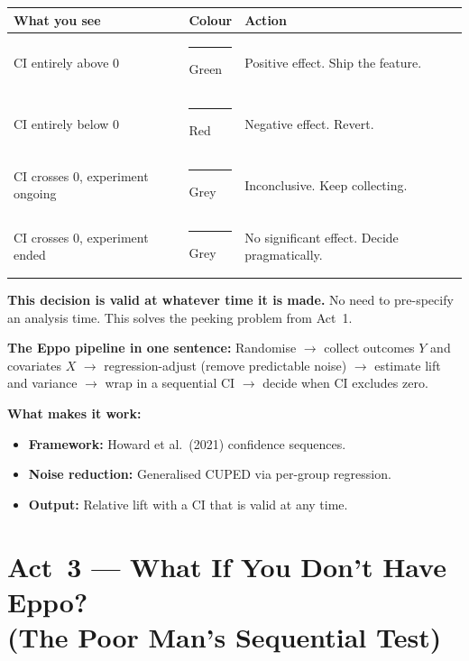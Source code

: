 \documentclass[12pt, a4paper]{article}
\begin{document}
\begin{center}
\renewcommand{\arraystretch}{1.3}
\begin{tabular}{@{} l l p{6.5cm} @{}}
\toprule
\textbf{What you see} & \textbf{Colour} & \textbf{Action} \\
\midrule
CI entirely above 0
  & \textcolor{green!60!black}{\rule{1em}{1em}} Green
  & Positive effect.  Ship the feature. \\
CI entirely below 0
  & \textcolor{red}{\rule{1em}{1em}} Red
  & Negative effect.  Revert. \\
CI crosses 0, experiment ongoing
  & \textcolor{gray}{\rule{1em}{1em}} Grey
  & Inconclusive.  Keep collecting. \\
CI crosses 0, experiment ended
  & \textcolor{gray}{\rule{1em}{1em}} Grey
  & No significant effect.  Decide pragmatically. \\
\bottomrule
\end{tabular}
\end{center}

\textbf{This decision is valid at whatever time it is made.}  No need to
pre-specify an analysis time.  This solves the peeking problem from Act~1.

\begin{keytakeaway}
\textbf{The Eppo pipeline in one sentence:}
Randomise $\to$ collect outcomes $Y$ and covariates $X$ $\to$
regression-adjust (remove predictable noise) $\to$ estimate lift and variance
$\to$ wrap in a sequential CI $\to$ decide when CI excludes zero.

\textbf{What makes it work:}
\begin{itemize}[nosep]
  \item \textbf{Framework:} Howard et al.\ (2021) confidence sequences.
  \item \textbf{Noise reduction:} Generalised CUPED via per-group regression.
  \item \textbf{Output:} Relative lift with a CI that is valid at any time.
\end{itemize}
\end{keytakeaway}


\newpage
\section{Act~3 --- What If You Don't Have Eppo?\\
         (The Poor Man's Sequential Test)}
\end{document}
